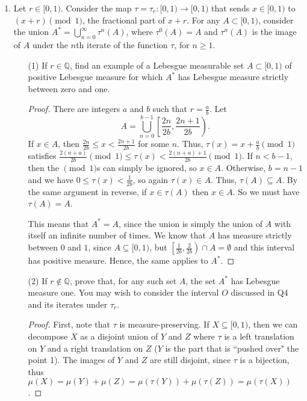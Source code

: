 \documentclass[10pt]{article}
\newcommand{\Q}{\mathbb{Q}}
\begin{document}
\begin{enumerate}
\item Let $r \in [0,1)$.  Consider the map $\tau = \tau_r: [0,1) \rightarrow [0,1)$ that sends $x \in [0,1)$ to $(x+r) \pmod{1}$, the fractional part of $x + r$.  For any $A \subset [0,1)$, consider the union $A^* = \bigcup_{n=0}^\infty \tau^n(A)$, where $\tau^0(A) = A$ and $\tau^n(A)$ is the image of $A$ under the $n$th iterate of the function $\tau$, for $n \geq 1$.
\begin{enumerate}
\item[(1)] If $r \in \Q$, find an example of a Lebesgue measurable set $A \subset [0,1)$ of positive Lebesgue measure for which $A^*$ has Lebesgue measure strictly between zero and one.

\begin{proof}
There are integers $a$ and $b$ such that $r = \frac{a}{b}$.  Let
$$
A = \bigcup_{n=0}^{b-1} \left[\frac{2n}{2b}, \frac{2n+1}{2b} \right).
$$
If $x \in A$, then $\frac{2n}{2b} \leq x < \frac{2n+1}{2b}$ for some $n$.  Thus, $\tau(x) = x + \frac{a}{b} \pmod{1}$ satisfies $\frac{2(n+a)}{2b} \pmod{1} \leq \tau(x) < \frac{2(n+a)+1}{2b} \pmod{1}$.  If $n < b-1$, then the $\pmod{1}$s can simply be ignored, so $x \in A$.  Otherwise, $b = n-1$ and we have $0 \leq \tau(x) < \frac{1}{2b}$, so again $\tau(x) \in A$.  Thus, $\tau(A) \subseteq A$.  By the same argument in reverse, if $x \in \tau(A)$ then $x \in A$.  So we must have $\tau(A) = A$.

This means that $A^* = A$, since the union is simply the union of $A$ with itself an infinite number of times.  We know that $A$ has measure strictly between $0$ and $1$, since $A \subseteq [0,1)$, but $\left[\frac{1}{2b}, \frac{2}{2b} \right) \cap A = \emptyset$ and this interval has positive measure.  Hence, the same applies to $A^*$.

\end{proof}

\item[(2)] If $r \not \in \Q$, prove that, for any such set $A$, the set $A^*$ has Lebesgue measure one.  You may wish to consider the interval $O$ discussed in Q4 and its iterates under $\tau_r$.

\begin{proof}

First, note that $\tau$ is measure-preserving.  If $X \subseteq [0,1)$, then we can decompose $X$ as a disjoint union of $Y$ and $Z$ where $\tau$ is a left translation on $Y$ and a right translation on $Z$ ($Y$ is the part that is ``pushed over" the point 1).  The images of $Y$ and $Z$ are still disjoint, since $\tau$ is a bijection, thus $\mu(X) = \mu(Y) + \mu(Z) = \mu(\tau(Y)) + \mu(\tau(Z)) = \mu(\tau(X))$.


\end{proof}
\end{enumerate}
\end{enumerate}
\end{document}
